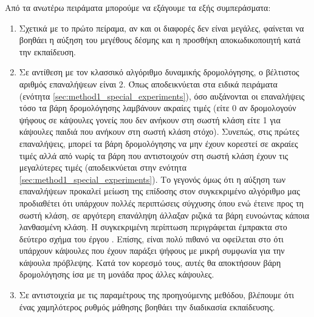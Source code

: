 Από τα ανωτέρω πειράματα μπορούμε να εξάγουμε τα εξής συμπεράσματα:
\begin{enumerate}
    \item Σχετικά με το πρώτο πείραμα, αν και οι διαφορές δεν είναι μεγάλες, φαίνεται να βοηθάει η αύξηση του μεγέθους δέσμης και η προσθήκη αποκωδικοποιητή κατά την εκπαίδευση.
    \item Σε αντίθεση με τον κλασσικό αλγόριθμο δυναμικής δρομολόγησης, ο βέλτιστος αριθμός επαναλήψεων είναι 2. Όπως αποδεικνύεται στα ειδικά πειράματα (ενότητα \ref{sec:method1_special_experiments}), όσο αυξάνονται οι επαναλήψεις τόσο τα βάρη δρομολόγησης λαμβάνουν ακραίες τιμές (είτε 0 αν δρομολογούν ψήφους σε κάψουλες γονείς που δεν ανήκουν στη σωστή κλάση είτε 1 για κάψουλες παιδιά που ανήκουν στη σωστή κλάση στόχο). Συνεπώς, στις πρώτες επαναλήψεις, μπορεί τα βάρη δρομολόγησης να μην έχουν κορεστεί σε ακραίες τιμές αλλά από νωρίς τα βάρη που αντιστοιχούν στη σωστή κλάση έχουν τις μεγαλύτερες τιμές (αποδεικνύεται στην ενότητα \ref{sec:method1_special_experiments}). Το γεγονός όμως ότι η αύξηση των επαναλήψεων προκαλεί μείωση της επίδοσης στον συγκεκριμένο αλγόριθμο μας προδιαθέτει ότι υπάρχουν πολλές περιπτώσεις σύγχυσης όπου ενώ έτεινε προς τη σωστή κλάση, σε αργότερη επανάληψη άλλαξαν ριζικά τα βάρη ευνοώντας κάποια λανθασμένη κλάση. Η συγκεκριμένη περίπτωση περιγράφεται έμπρακτα στο δεύτερο σχήμα του έργου \cite{hinton2018matrix}. Επίσης, είναι πολύ πιθανό να οφείλεται στο ότι υπάρχουν κάψουλες που έχουν παράξει ψήφους με μικρή συμφωνία για την κάψουλα πρόβλεψης. Κατά τον κορεσμό τους, αυτές θα αποκτήσουν βάρη δρομολόγησης ίσα με τη μονάδα προς άλλες κάψουλες.
    \item Σε αντιστοιχεία με τις παραμέτρους της προηγούμενης μεθόδου, βλέπουμε ότι ένας χαμηλότερος ρυθμός μάθησης βοηθάει την διαδικασία εκπαίδευσης.
\end{enumerate}
